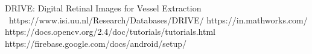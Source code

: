 \begin{thebibliography}{3}
\bibitem{} DRIVE: Digital Retinal Images for Vessel Extraction ~https://www.isi.uu.nl/Research/Databases/DRIVE/
\bibitem{} https://in.mathworks.com/
\bibitem{} https://docs.opencv.org/2.4/doc/tutorials/tutorials.html https://firebase.google.com/docs/android/setup/
\end{thebibliography}